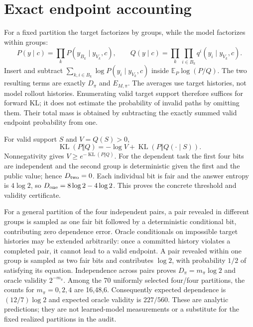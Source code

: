 \documentclass{article}
\newcommand{\KL}{\operatorname{KL}}
\newcommand{\E}{\mathbb E}
\begin{document}
\section{Exact endpoint accounting}
For a fixed partition the target factorizes by groups, while the model
factorizes within groups:
\[
 P(y\mid c)=\prod_k P(y_{B_k}\mid y_{V_k},c),\qquad
 Q(y\mid c)=\prod_k\prod_{i\in B_k}q^i(y_i\mid y_{V_k},c).
\]
Insert and subtract $\sum_{k,i\in B_k}\log P(y_i\mid y_{V_k},c)$ inside
$\E_P\log(P/Q)$. The two resulting terms are exactly $D_\pi$ and $E_{M,\pi}$.
The averages use target histories, not model rollout histories. Enumerating
valid target support therefore suffices for forward KL; it does not estimate
the probability of invalid paths by omitting them. Their total mass is obtained
by subtracting the exactly summed valid endpoint probability from one.

For valid support $S$ and $V=Q(S)>0$,
\[
 \KL(P\Vert Q)=-\log V+\KL(P\Vert Q(\cdot\mid S)).
\]
Nonnegativity gives $V\ge e^{-\KL(P\Vert Q)}$. For the dependent task the
first four bits are independent and the second group is deterministic given
the first and the public value; hence $D_{\rm two}=0$. Each individual bit is
fair and the answer entropy is $4\log2$, so $D_{\rm one}=8\log2-4\log2$.
This proves the concrete threshold and validity certificate.

For a general partition of the four independent pairs, a pair revealed in
different groups is sampled as one fair bit followed by a deterministic
conditional bit, contributing zero dependence error. Oracle conditionals on
impossible target histories may be extended arbitrarily: once a committed
history violates a completed pair, it cannot lead to a valid endpoint. A pair revealed within
one group is sampled as two fair bits and contributes $\log2$, with probability
$1/2$ of satisfying its equation. Independence across pairs proves
$D_\pi=m_\pi\log2$ and oracle validity $2^{-m_\pi}$. Among the 70 uniformly
selected four/four partitions, the counts for $m_\pi=0,2,4$ are 16,48,6.
Consequently expected dependence is $(12/7)\log2$ and expected oracle validity
is $227/560$. These are analytic predictions; they are not learned-model
measurements or a substitute for the fixed realized partitions in the audit.
\end{document}

